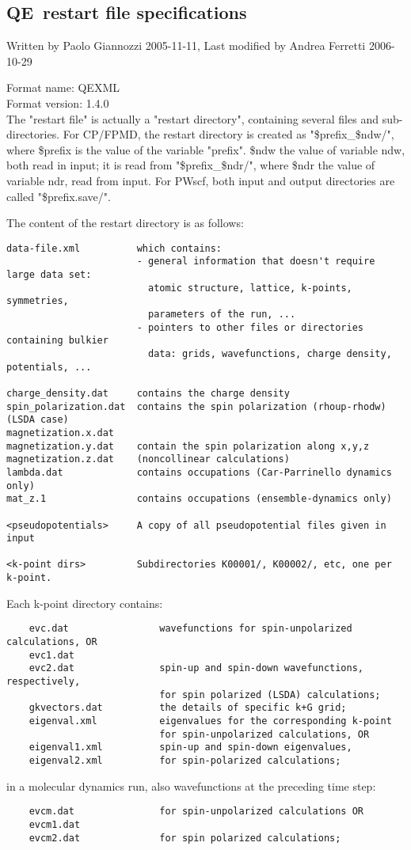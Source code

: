 \documentclass[12pt,a4paper]{article}
\def\qe{QE}
\begin{document}
\subsection{\qe\ restart file specifications}

Written by Paolo Giannozzi 2005-11-11,
Last modified by Andrea Ferretti 2006-10-29

Format name: QEXML \\
Format version: 1.4.0 \\

The "restart file" is actually a "restart directory", containing
several files and sub-directories. For CP/FPMD, the restart directory
is created as "\$prefix\_\$ndw/", where \$prefix is the value of the
variable "prefix". \$ndw the value of variable ndw, both read in
input; it is read from "\$prefix\_\$ndr/", where \$ndr the value of
variable ndr, read from input. For PWscf, both input and output
directories are called "\$prefix.save/".

The content of the restart directory is as follows:
\begin{verbatim}
data-file.xml          which contains:
                       - general information that doesn't require large data set:
                         atomic structure, lattice, k-points, symmetries,
                         parameters of the run, ...
                       - pointers to other files or directories containing bulkier
                         data: grids, wavefunctions, charge density, potentials, ...

charge_density.dat     contains the charge density
spin_polarization.dat  contains the spin polarization (rhoup-rhodw) (LSDA case)
magnetization.x.dat
magnetization.y.dat    contain the spin polarization along x,y,z
magnetization.z.dat    (noncollinear calculations)
lambda.dat             contains occupations (Car-Parrinello dynamics only)
mat_z.1                contains occupations (ensemble-dynamics only)

<pseudopotentials>     A copy of all pseudopotential files given in input

<k-point dirs>         Subdirectories K00001/, K00002/, etc, one per k-point.
\end{verbatim}
Each k-point directory contains:
\begin{verbatim}
    evc.dat                wavefunctions for spin-unpolarized calculations, OR
    evc1.dat
    evc2.dat               spin-up and spin-down wavefunctions, respectively,
                           for spin polarized (LSDA) calculations;
    gkvectors.dat          the details of specific k+G grid;
    eigenval.xml           eigenvalues for the corresponding k-point
                           for spin-unpolarized calculations, OR
    eigenval1.xml          spin-up and spin-down eigenvalues,
    eigenval2.xml          for spin-polarized calculations;
\end{verbatim}
in a molecular dynamics run, also wavefunctions at the preceding time step:
\begin{verbatim}
    evcm.dat               for spin-unpolarized calculations OR
    evcm1.dat
    evcm2.dat              for spin polarized calculations;
\end{verbatim}
\end{document}
